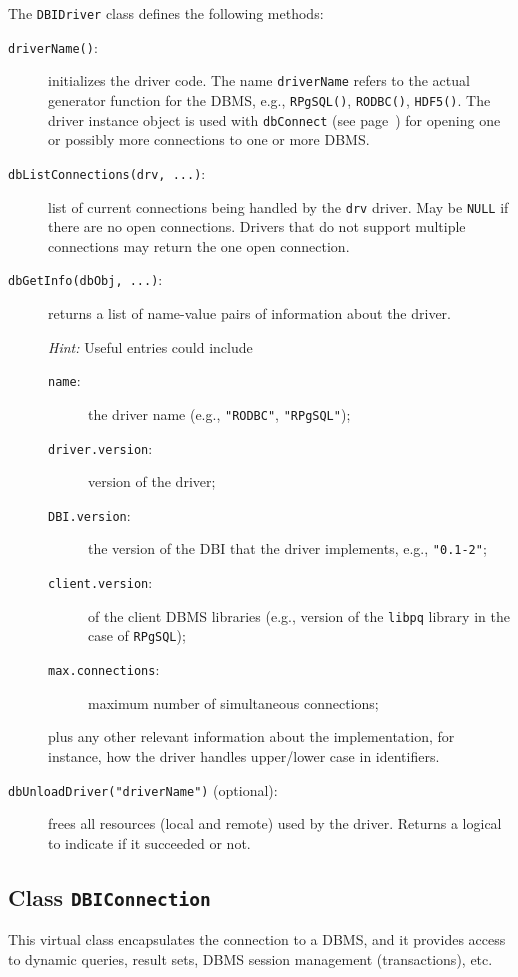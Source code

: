 \documentclass[graphics,times,psfig,dvips,hyper]{article}
\newcommand{\sfun}[1]{\mbox{\tt #1()}}  %
\newcommand{\sobj}[1]{\mbox{\tt #1}}    %
\newcommand{\sexp}[1]{\mbox{\tt #1}}    %
\newcommand{\sclass}[1]{\mbox{\tt #1}}  %
\newcommand{\smethod}[1]{\mbox{\tt #1}} %
\begin{document}
The \sclass{DBIDriver} class defines the following methods:
\begin{description}

\item[\sfun{driverName}:]\label{meth:driverName}
  initializes the driver code. The name \sobj{driverName} refers to
  the actual generator function for the DBMS, e.g., \sfun{RPgSQL},
  \sfun{RODBC}, \sfun{HDF5}.  The driver instance object is used
  with \smethod{dbConnect} (see page~\pageref{meth:dbConnect})
  for opening one or possibly more connections to one or more DBMS.

\item[\smethod{dbListConnections(drv, ...)}:]
  list of current connections being handled by the \sobj{drv}
  driver.  May be \sobj{NULL} if there are no open connections.
  Drivers that do not support multiple connections may return the
  one open connection.

\item[\smethod{dbGetInfo(dbObj, ...)}:]
  returns a list of name-value pairs of information about the
  driver.  

  \emph{Hint:} Useful entries could include 
  \begin{description}
  \item[\sobj{name}:] the driver name (e.g., \sexp{"RODBC"}, \sexp{"RPgSQL"}); 
  \item[\sobj{driver.version}:] version of the driver;
  \item[\sobj{DBI.version}:] the version of the DBI that the driver 
   implements, e.g., \sexp{"0.1-2"};
  \item[\sobj{client.version}:] of the client DBMS libraries (e.g., version
  of the \texttt{libpq} library in the case of \sobj{RPgSQL});
  \item[\sobj{max.connections}:] maximum number of simultaneous 
  connections; 
  \end{description}
  plus any other relevant information about the implementation, for instance, 
  how the driver handles upper/lower case in identifiers.

\item[\smethod{dbUnloadDriver("driverName")} (optional):]
  frees all resources (local and remote) used by the driver.  
  Returns a logical to indicate if it succeeded or not.
 
\end{description}

\subsection{Class \sclass{DBIConnection}}\label{sec:DBIConnection}
This virtual class encapsulates the connection to a DBMS, and
it provides access to dynamic queries, result sets, DBMS session
management (transactions), etc.
\end{document}
